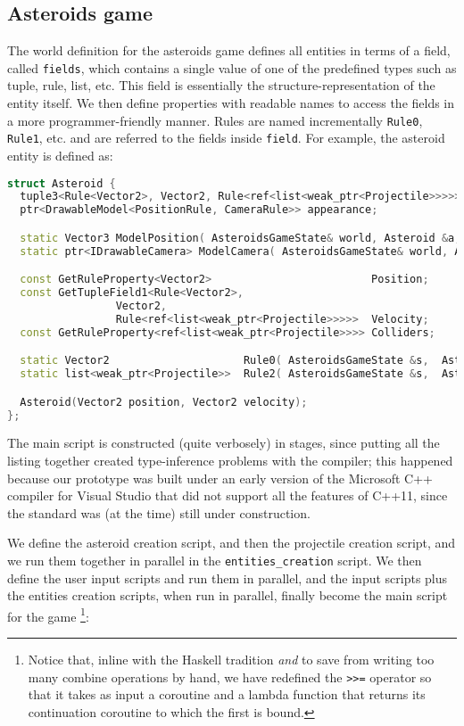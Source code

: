 \subsection{Asteroids game}
The world definition for the asteroids game defines all entities in terms of a field, called \texttt{fields}, which contains a single value of one of the predefined types such as tuple, rule, list, etc. This field is essentially the structure-representation of the entity itself. We then define properties with readable names to access the fields in a more programmer-friendly manner. Rules are named incrementally \texttt{Rule0}, \texttt{Rule1}, etc. and are referred to the fields inside \texttt{field}. For example, the asteroid entity is defined as:

\begin{lstlisting}[language=C++]
struct Asteroid {
  tuple3<Rule<Vector2>, Vector2, Rule<ref<list<weak_ptr<Projectile>>>>> fields;
  ptr<DrawableModel<PositionRule, CameraRule>> appearance;

  static Vector3 ModelPosition( AsteroidsGameState& world, Asteroid &a, float dt );
  static ptr<IDrawableCamera> ModelCamera( AsteroidsGameState& world, Asteroid &a, float dt );

  const GetRuleProperty<Vector2>                         Position;
  const GetTupleField1<Rule<Vector2>, 
                 Vector2, 
                 Rule<ref<list<weak_ptr<Projectile>>>>>  Velocity;
  const GetRuleProperty<ref<list<weak_ptr<Projectile>>>> Colliders;

  static Vector2                     Rule0( AsteroidsGameState &s,  Asteroid &e, float dt);
  static list<weak_ptr<Projectile>>  Rule2( AsteroidsGameState &s,  Asteroid &e, float dt);

  Asteroid(Vector2 position, Vector2 velocity);
};
\end{lstlisting}

The main script is constructed (quite verbosely) in stages, since putting all the listing together created type-inference problems with the compiler; this happened because our prototype was built under an early version of the Microsoft C++ compiler for Visual Studio that did not support all the features of C++11, since the standard was (at the time) still under construction.

We define the asteroid creation script, and then the projectile creation script, and we run them together in parallel in the \texttt{entities\_creation} script. We then define the user input scripts and run them in parallel, and the input scripts plus the entities creation scripts, when run in parallel, finally become the main script for the game \footnote{Notice that, inline with the Haskell tradition \textit{and} to save from writing too many combine operations by hand, we have redefined the \texttt{>>=} operator so that it takes as input a coroutine and a lambda function that returns its continuation coroutine to which the first is bound.}:


